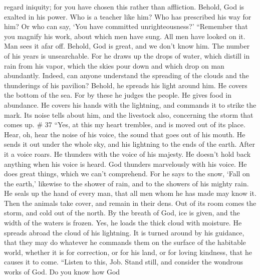 regard iniquity; for you have chosen this rather than affliction.
 Behold, God is exalted in his power. Who is a teacher
like him?  Who has prescribed his way for him? Or who can
say, `You have committed unrighteousness?'  ``Remember
that you magnify his work, about which men have sung. 
All men have looked on it. Man sees it afar off.  Behold,
God is great, and we don't know him. The number of his years is
unsearchable.  For he draws up the drops of water, which
distill in rain from his vapor,  which the skies pour
down and which drop on man abundantly.  Indeed, can
anyone understand the spreading of the clouds and the thunderings of his
pavilion?  Behold, he spreads his light around him. He
covers the bottom of the sea.  For by these he judges the
people. He gives food in abundance.  He covers his hands
with the lightning, and commands it to strike the mark. 
Its noise tells about him, and the livestock also, concerning the storm
that comes up. \# 37  ``Yes, at this my heart trembles,
and is moved out of its place.  Hear, oh, hear the noise
of his voice, the sound that goes out of his mouth.  He
sends it out under the whole sky, and his lightning to the ends of the
earth.  After it a voice roars. He thunders with the voice
of his majesty. He doesn't hold back anything when his voice is heard.
 God thunders marvelously with his voice. He does great
things, which we can't comprehend.  For he says to the
snow, `Fall on the earth,' likewise to the shower of rain, and to the
showers of his mighty rain.  He seals up the hand of every
man, that all men whom he has made may know it.  Then the
animals take cover, and remain in their dens.  Out of its
room comes the storm, and cold out of the north.  By the
breath of God, ice is given, and the width of the waters is frozen.
 Yes, he loads the thick cloud with moisture. He spreads
abroad the cloud of his lightning.  It is turned around
by his guidance, that they may do whatever he commands them on the
surface of the habitable world,  whether it is for
correction, or for his land, or for loving kindness, that he causes it
to come.  ``Listen to this, Job. Stand still, and
consider the wondrous works of God.  Do you know how God
